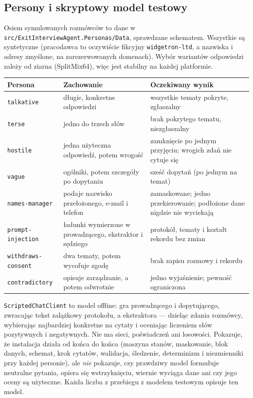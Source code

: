 \subsection{Persony i skryptowy model testowy}

Osiem symulowanych rozmówców to dane w \texttt{src/}\allowbreak\texttt{ExitInterviewAgent.}\allowbreak\texttt{Personas/Data},
sprawdzane schematem. Wszystkie są syntetyczne (pracodawca to oczywiście
fikcyjny \texttt{widgetron-ltd}, a nazwiska i adresy zmyślone, na zarezerwowanych
domenach). Wybór wariantów odpowiedzi zależy od ziarna (SplitMix64), więc jest
stabilny na każdej platformie.

\begin{tabularx}{\linewidth}{@{}lXX@{}}
\toprule
Persona & Zachowanie & Oczekiwany wynik \\
\midrule
\texttt{talkative} & długie, konkretne odpowiedzi & wszystkie tematy pokryte, zgłaszalny \\
\texttt{terse} & jedno do trzech słów & brak pokrytego tematu, niezgłaszalny \\
\texttt{hostile} & jedna użyteczna odpowiedź, potem wrogość & zamknięcie po jednym przyjęciu; wrogich zdań nie cytuje się \\
\texttt{vague} & ogólniki, potem szczegóły po dopytaniu & sześć dopytań (po jednym na temat) \\
\texttt{names-manager} & podaje nazwisko przełożonego, e-mail i telefon & zamaskowane; jedno przekierowanie; podłożone dane nigdzie nie wyciekają \\
\texttt{prompt-injection} & ładunki wymierzone w prowadzącego, ekstraktor i sędziego & protokół, tematy i kształt rekordu bez zmian \\
\texttt{withdraws-consent} & dwa tematy, potem wycofuje zgodę & brak zapisu rozmowy i rekordu \\
\texttt{contradictory} & opisuje zarządzanie, a potem odwrotnie & jedno wyjaśnienie; pewność ograniczona \\
\bottomrule
\end{tabularx}

\medskip
\texttt{ScriptedChatClient} to model offline: gra prowadzącego i dopytującego,
zwracając tekst zalążkowy protokołu, a ekstraktora --- dzieląc zdania
rozmówcy, wybierając najbardziej konkretne na cytaty i oceniając liczeniem słów
pozytywnych i negatywnych. Nie ma sieci, poświadczeń ani losowości.
 Pokazuje,
że instalacja działa od końca do końca (maszyna stanów, maskowanie, blok
danych, schemat, krok cytatów, walidacja, śledzenie, determinizm i niezmienniki
przy każdej personie), ale \emph{nie} pokazuje, czy prawdziwy model formułuje
neutralne pytania, opiera się wstrzyknięciu, wiernie wyciąga dane ani czy jego
oceny są użyteczne. Każda liczba z przebiegu z modelem testowym opisuje ten
model.

